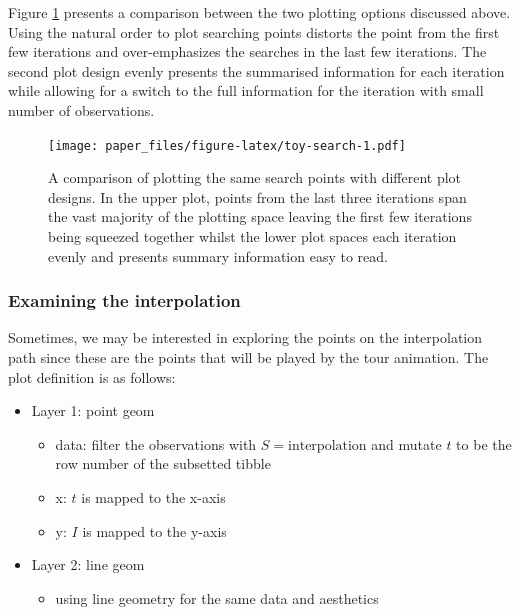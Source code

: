 \documentclass[12pt]{article}
\providecommand{\tightlist}{%
  \setlength{\itemsep}{0pt}\setlength{\parskip}{0pt}}
\begin{document}
Figure \ref{toy-search} presents a comparison between the two plotting
options discussed above. Using the natural order to plot searching
points distorts the point from the first few iterations and
over-emphasizes the searches in the last few iterations. The second plot
design evenly presents the summarised information for each iteration
while allowing for a switch to the full information for the iteration
with small number of observations.

\begin{figure}
\centering
\texttt{[image: paper\_files/figure-latex/toy-search-1.pdf]}
\caption{\label{toy-search}A comparison of plotting the same search
points with different plot designs. In the upper plot, points from the
last three iterations span the vast majority of the plotting space
leaving the first few iterations being squeezed together whilst the
lower plot spaces each iteration evenly and presents summary information
easy to read.}
\end{figure}

\newpage

\hypertarget{examining-the-interpolation}{%
\subsubsection{Examining the
interpolation}\label{examining-the-interpolation}}

Sometimes, we may be interested in exploring the points on the
interpolation path since these are the points that will be played by the
tour animation. The plot definition is as follows:

\begin{itemize}
\tightlist
\item
  Layer 1: point geom

  \begin{itemize}
  \tightlist
  \item
    data: filter the observations with \(S = \text{interpolation}\) and
    mutate \(t\) to be the row number of the subsetted tibble
  \item
    x: \(t\) is mapped to the x-axis
  \item
    y: \(I\) is mapped to the y-axis
  \end{itemize}
\item
  Layer 2: line geom

  \begin{itemize}
  \tightlist
  \item
    using line geometry for the same data and aesthetics
  \end{itemize}
\end{itemize}
\end{document}
